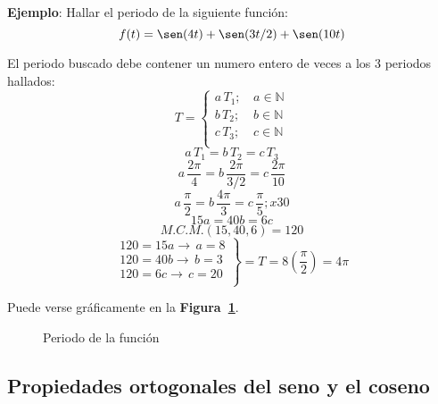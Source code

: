 \textbf{Ejemplo}: Hallar el periodo de la siguiente función:
\begin{equation*}
    f(t)=\sen(4t)+\sen(3t/2)+\sen(10t)
\end{equation*}

El periodo buscado debe contener un numero entero de veces a los 3 periodos
hallados:
\begin{equation*}
    T=\begin{cases}
        a\,T_1;&\,a\in\mathbb{N}\\
        b\,T_2;&\,b\in\mathbb{N}\\
        c\,T_3;&\,c\in\mathbb{N}\\
    \end{cases}
\end{equation*}
\begin{equation*}
    a\,T_1=b\,T_2=c\,T_3
\end{equation*}
\begin{equation*}
    a\,\frac{2\pi}{4}=b\,\frac{2\pi}{3/2}=c\,\frac{2\pi}{10}
\end{equation*}
\begin{equation*}
    a\,\frac{\pi}{2}=b\,\frac{4\pi}{3}=c\,\frac{\pi}{5};x30
\end{equation*}
\begin{equation*}
    15a=40b=6c
\end{equation*}
\begin{equation*}
    M.C.M.(15,40,6)=120
\end{equation*}
\begin{equation*}
\left.\begin{aligned}
    120=15a\rightarrow\,a=8\\
    120=40b\rightarrow\,b=3\\
    120=6c\rightarrow\,c=20\\
\end{aligned}\right\}=T=8\left(\frac{\pi}{2}\right)=4\pi
\end{equation*}

Puede verse gráficamente en la \textbf{Figura~\ref{figura_06}}.
\begin{figure}[H]
    \centering
    
    \caption{Periodo de la función}\label{figura_06}
\end{figure}

\subsection{Propiedades ortogonales del seno y el coseno}
